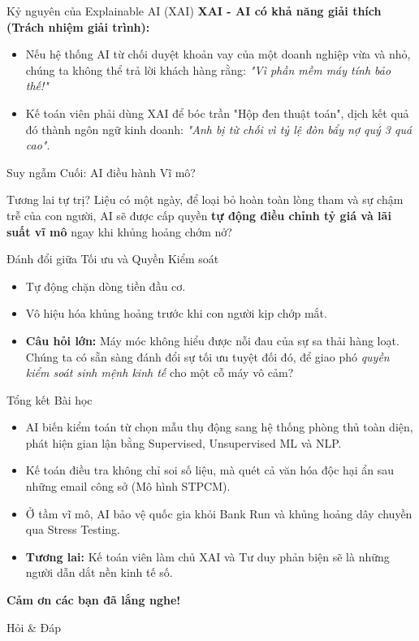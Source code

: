 \documentclass[aspectratio=169]{beamer}
\begin{document}
\begin{frame}{Kỷ nguyên của Explainable AI (XAI)}
    \textbf{XAI - AI có khả năng giải thích (Trách nhiệm giải trình):}
    \begin{itemize}
        \item Nếu hệ thống AI từ chối duyệt khoản vay của một doanh nghiệp vừa và nhỏ, chúng ta không thể trả lời khách hàng rằng: \textit{"Vì phần mềm máy tính bảo thế!"}
        \item Kế toán viên phải dùng XAI để bóc trần "Hộp đen thuật toán", dịch kết quả đó thành ngôn ngữ kinh doanh: \textit{"Anh bị từ chối vì tỷ lệ đòn bẩy nợ quý 3 quá cao"}.
    \end{itemize}
\end{frame}

\begin{frame}{Suy ngẫm Cuối: AI điều hành Vĩ mô?}
    \begin{exampleblock}{Tương lai tự trị?}
        Liệu có một ngày, để loại bỏ hoàn toàn lòng tham và sự chậm trễ của con người, AI sẽ được cấp quyền \textbf{tự động điều chỉnh tỷ giá và lãi suất vĩ mô} ngay khi khủng hoảng chớm nở?
    \end{exampleblock}
\end{frame}

\begin{frame}{Đánh đổi giữa Tối ưu và Quyền Kiểm soát}
    \begin{itemize}
        \item Tự động chặn dòng tiền đầu cơ.
        \item Vô hiệu hóa khủng hoảng trước khi con người kịp chớp mắt.
        \item \textbf{Câu hỏi lớn:} Máy móc không hiểu được nỗi đau của sự sa thải hàng loạt. Chúng ta có sẵn sàng đánh đổi sự tối ưu tuyệt đối đó, để giao phó \textit{quyền kiểm soát sinh mệnh kinh tế} cho một cỗ máy vô cảm?
    \end{itemize}
\end{frame}

\begin{frame}{Tổng kết Bài học}
    \begin{itemize}
        \item AI biến kiểm toán từ chọn mẫu thụ động sang hệ thống phòng thủ toàn diện, phát hiện gian lận bằng Supervised, Unsupervised ML và NLP.
        \item Kế toán điều tra không chỉ soi số liệu, mà quét cả văn hóa độc hại ẩn sau những email công sở (Mô hình STPCM).
        \item Ở tầm vĩ mô, AI bảo vệ quốc gia khỏi Bank Run và khủng hoảng dây chuyền qua Stress Testing.
        \item \textbf{Tương lai:} Kế toán viên làm chủ XAI và Tư duy phản biện sẽ là những người dẫn dắt nền kinh tế số.
    \end{itemize}
\end{frame}

\begin{frame}
    \centering
    \Huge \textbf{Cảm ơn các bạn đã lắng nghe!}
    
    \vspace{0.5cm}
    \Large Hỏi \& Đáp
\end{frame}
\end{document}
